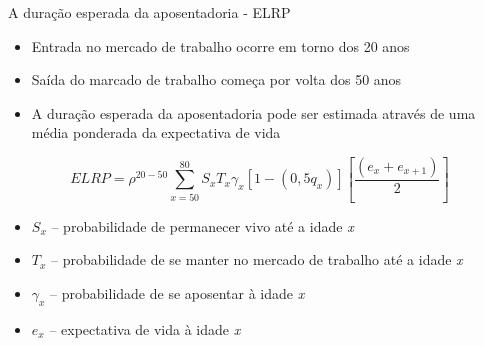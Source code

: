 \documentclass{beamer}
\begin{document}
\begin{frame}{A duração esperada da aposentadoria - ELRP}
	\begin{itemize}
		\item{Entrada no mercado de trabalho ocorre em torno dos 20 anos}
		\item{Saída do marcado de trabalho começa por volta dos 50 anos}
		\item{A duração esperada da aposentadoria pode ser estimada através de uma média ponderada da expectativa de vida}
	\end{itemize}
	\begin{equation}
		ELRP = \rho^{20-50}\sum_{x=50}^{80}S_{x}T_{x}\gamma_{x}[1-(0,5q_x)]\left[\dfrac{(e_x + e_{x+1})}{2}\right]
	\end{equation}
	\begin{itemize}
		\item{$S_{x}$ -- probabilidade de permanecer vivo até a idade \emph{x}}
		\item{$T_{x}$ -- probabilidade de se manter no mercado de trabalho até a idade \emph{x}}
		\item{$\gamma_{x}$ -- probabilidade de se aposentar à idade \emph{x}}
		\item{$e_{x}$ -- expectativa de vida à idade \emph{x}}
	\end{itemize}
\end{frame}
\end{document}
